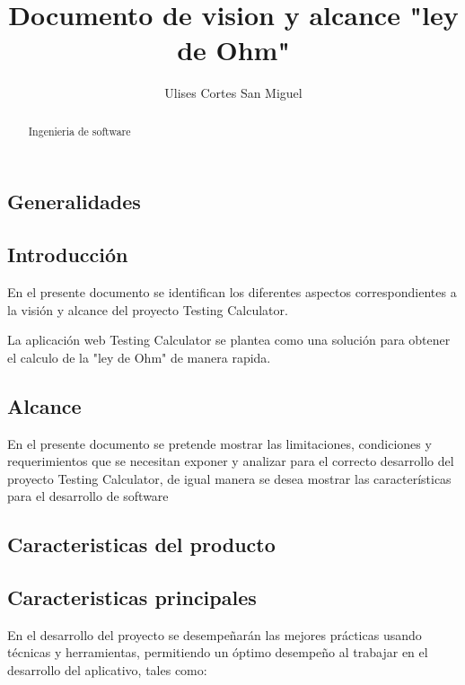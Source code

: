 \documentclass{article}
\title{Documento de vision y alcance "ley de Ohm"}
\author{Ulises Cortes San Miguel}
\begin{document}
\maketitle

\begin{abstract}
Ingenieria de software
\end{abstract}

\begin{center}
\section{Generalidades}
\end{center}

\subsection{Introducción}

En el presente documento se identifican los diferentes aspectos
correspondientes a la visión y alcance del proyecto Testing Calculator.

La aplicación web Testing Calculator se plantea como una solución para obtener el calculo de la "ley de Ohm" de manera rapida.

\subsection{Alcance}
En el presente documento se pretende mostrar las limitaciones, condiciones y
requerimientos que se necesitan exponer y analizar para el correcto desarrollo
del proyecto Testing Calculator, de igual manera se desea mostrar las
características para el desarrollo de software

\begin{center}
\section{Caracteristicas del producto}
\end{center}

\subsection{Caracteristicas principales}

En el desarrollo del proyecto se desempeñarán las mejores prácticas usando
técnicas y herramientas, permitiendo un óptimo desempeño al trabajar en el desarrollo del aplicativo, tales como:
\end{document}

